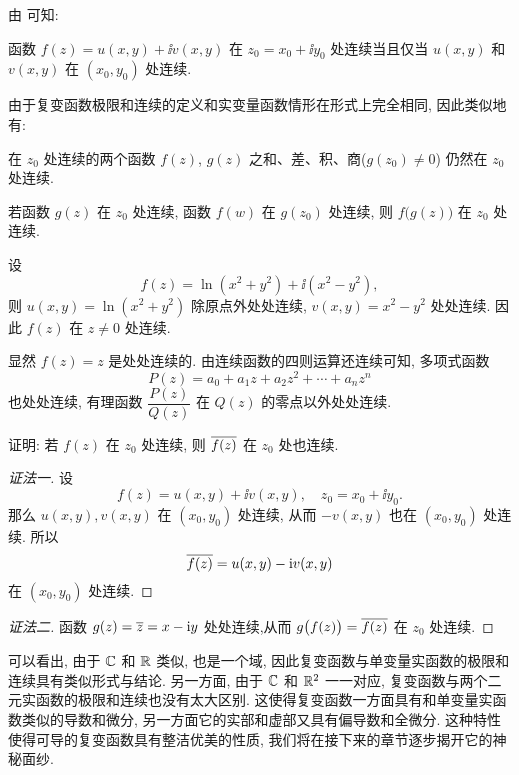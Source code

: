 由 可知:
\begin{theorem}
  函数 $f(z)=u(x,y)+\ii v(x,y)$ 在 $z_0=x_0+\ii y_0$ 处连续当且仅当 $u(x,y)$ 和 $v(x,y)$ 在 $(x_0,y_0)$ 处连续.
\end{theorem}

由于复变函数极限和连续的定义和实变量函数情形在形式上完全相同, 因此类似地有:
\begin{theorem}
  \begin{enuma}
    \item 在 $z_0$ 处连续的两个函数 $f(z)$, $g(z)$ 之和、差、积、商($g(z_0)\neq 0$) 仍然在 $z_0$ 处连续.
    \item 若函数 $g(z)$ 在 $z_0$ 处连续, 函数 $f(w)$ 在 $g(z_0)$ 处连续, 则 $f\bigl(g(z)\bigr)$ 在 $z_0$ 处连续.
  \end{enuma}
\end{theorem}

\begin{exampleenum}
  \item 设
  \[
    f(z)=\ln(x^2+y^2)+\ii(x^2-y^2),
  \]
  则 $u(x,y)=\ln(x^2+y^2)$ 除原点外处处连续, $v(x,y)=x^2-y^2$ 处处连续. 因此 $f(z)$ 在 $z\neq0$ 处连续.
  \item 显然 $f(z)=z$ 是处处连续的.
  由连续函数的四则运算还连续可知, 多项式函数
  \[
    P(z)=a_0+a_1z+a_2z^2+\cdots+a_nz^n
  \]
  也处处连续, 有理函数 $\dfrac{P(z)}{Q(z)}$ 在 $Q(z)$ 的零点以外处处连续.
\end{exampleenum}

\begin{example}
  证明: 若 $f(z)$ 在 $z_0$ 处连续, 则 $\overline{f(z)}$ 在 $z_0$ 处也连续.
\end{example}

\begin{proof}[证法一]
  设
  \[
    f(z)=u(x,y)+\ii v(x,y),\quad
    z_0=x_0+\ii y_0.
  \]
  那么 $u(x,y),v(x,y)$ 在 $(x_0,y_0)$ 处连续, 从而 $-v(x,y)$ 也在 $(x_0,y_0)$ 处连续.
  所以
  \[
    \overline{f(z)}=u(x,y)-\mathrm{i} v(x,y)
  \]
  在 $(x_0,y_0)$ 处连续.
\end{proof}

\begin{proof}[证法二]
  函数 $g(z)=\overline z=x-\mathrm{i} y$ 处处连续,从而 $g\bigl(f(z)\bigr)=\overline{f(z)}$ 在 $z_0$ 处连续.
\end{proof}

可以看出, 由于 ${\mathbb{C}}$ 和 ${\mathbb{R}}$ 类似, 也是一个域, 因此复变函数与单变量实函数的极限和连续具有类似形式与结论.
另一方面, 由于 ${\mathbb{C}}$ 和 ${\mathbb{R}}^2$ 一一对应, 复变函数与两个二元实函数的极限和连续也没有太大区别.
这使得复变函数一方面具有和单变量实函数类似的导数和微分, 另一方面它的实部和虚部又具有偏导数和全微分.
这种特性使得可导的复变函数具有整洁优美的性质, 我们将在接下来的章节逐步揭开它的神秘面纱.


